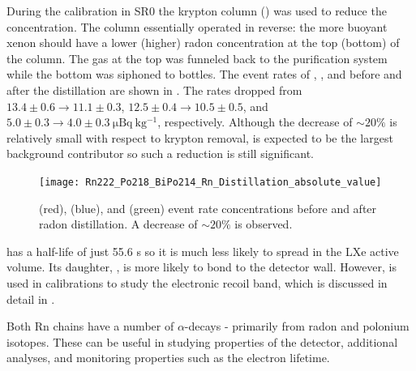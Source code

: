 During the  calibration in SR0 the krypton column () was used to reduce the 
concentration.  The column essentially operated in reverse: the more buoyant xenon should have a lower (higher) radon concentration at the
top (bottom) of the column.  The gas at the top was funneled back to the purification system while the bottom was siphoned to
bottles.  The event rates of , , and  before and after the distillation are shown
in .  The rates dropped from $13.4 \pm 0.6 \rightarrow 11.1 \pm 0.3$,
$12.5 \pm 0.4 \rightarrow 10.5 \pm 0.5$, and $5.0 \pm 0.3 \rightarrow 4.0 \pm 0.3\ \mathrm{\mu Bq\ kg^{-1}}$, respectively.  Although the
decrease of ${\sim}20\%$ is relatively small with respect to krypton removal,  is expected to be the largest background
contributor so such a reduction is still significant.

\begin{figure}
\centering
\texttt{[image: Rn222\_Po218\_BiPo214\_Rn\_Distillation\_absolute\_value]}
\label{fig:backgrounds_electronic_radon_distillation}
\caption{ (red),  (blue), and  (green) event rate concentrations before and after radon
distillation.  A decrease of ${\sim} 20\%$ is observed.}
\end{figure}

 has a half-life of just 55.6 s so it is much less likely to spread in the LXe active volume.  Its daughter, ,
is more likely to bond to the detector wall.  However,  is used in calibrations to study the electronic recoil band, which is
discussed in detail in .

Both Rn chains have a number of $\alpha$-decays - primarily from radon and polonium isotopes.  These can be useful in studying properties
of the detector, additional analyses, and monitoring properties such as the electron lifetime.

